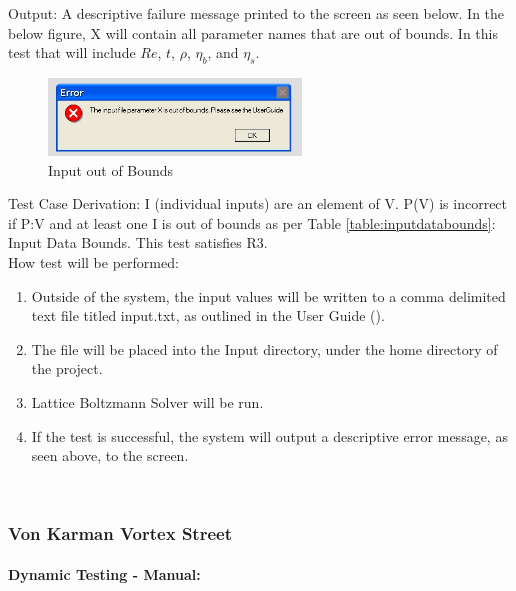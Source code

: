 \documentclass[12pt, titlepage]{article}
\newcommand{\famname}{Lattice Boltzmann Solver}
\begin{document}
\begin{enumerate}
Output: A descriptive failure message printed to the screen as seen below. In
the below figure, X will contain all parameter names that are out of bounds. In
this test that will include $Re$, $t$, $\rho$, $\eta_b$, and $\eta_s$.

\begin{figure}[h!]
	\begin{center}
		\includegraphics[width=0.6\textwidth]{errorMessage.jpeg}
		\caption{Input out of Bounds}
		\label{Fig_InputError}
	\end{center}
\end{figure}

Test Case Derivation: 
I (individual inputs) are an element of V. P(V) is incorrect if P:V and at least
one I is out of bounds as per Table \ref{table:inputdatabounds}: Input Data
Bounds. This test satisfies R3.\\

How test will be performed: 

\begin{enumerate}
\item Outside of the system, the input values will be written to a comma
  delimited text file titled input.txt, as outlined in the User Guide
  (\citet{LBM_UserGuide_PM}).
\item The file will be placed into the Input directory, under the home directory
  of the project.
\item {\famname} will be run.
\item If the test is successful, the system will output a descriptive error message, as seen above, to the screen.\\
\end{enumerate}

\end{enumerate}

~\newpage

\subsubsection{Von Karman Vortex Street}
\label{frvkvs}
		
\paragraph{Dynamic Testing - Manual:}
\end{document}
